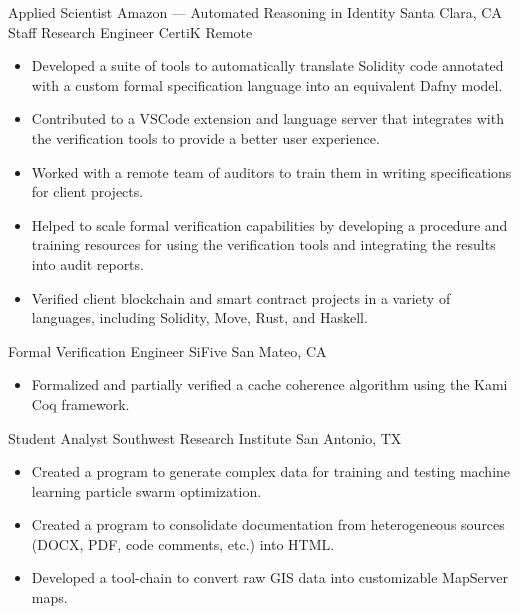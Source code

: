 \documentclass[10pt,letterpaper,sans]{moderncv}
\begin{document}
        {Applied Scientist}
        {Amazon --- Automated Reasoning in Identity}
        {Santa Clara, CA}
        {}
        {%
        }
        {Staff Research Engineer}
        {CertiK}
        {Remote}
        {}
        {%
          \begin{itemize}
            \item
              Developed a suite of tools to automatically translate Solidity
              code annotated with a custom formal specification language into an
              equivalent Dafny model.
            \item
              Contributed to a VSCode extension and language server that
              integrates with the verification tools to provide a better user
              experience.
            \item
              Worked with a remote team of auditors to train them in writing
              specifications for client projects.
            \item
              Helped to scale formal verification capabilities by developing a
              procedure and training resources for using the verification tools
              and integrating the results into audit reports.
            \item
              Verified client blockchain and smart contract projects in a
              variety of languages, including Solidity, Move, Rust, and Haskell.
          \end{itemize}
        }
        {Formal Verification Engineer}
        {SiFive}
        {San Mateo, CA}
        {}
        {%
          \begin{itemize}
            \item
              Formalized and partially verified a cache coherence algorithm
              using the Kami Coq framework.
          \end{itemize}
        }
        {Student Analyst}
        {Southwest Research Institute}
        {San Antonio, TX}
        {}
        {%
          \begin{itemize}
            \item
              Created a program to generate complex data for training and
              testing machine learning particle swarm optimization.
            \item
              Created a program to consolidate documentation from heterogeneous
              sources (DOCX, PDF, code comments, etc.) into HTML\@.
            \item
              Developed a tool-chain to convert raw GIS data into customizable
              MapServer maps.
        \end{itemize}
        }
\end{document}
